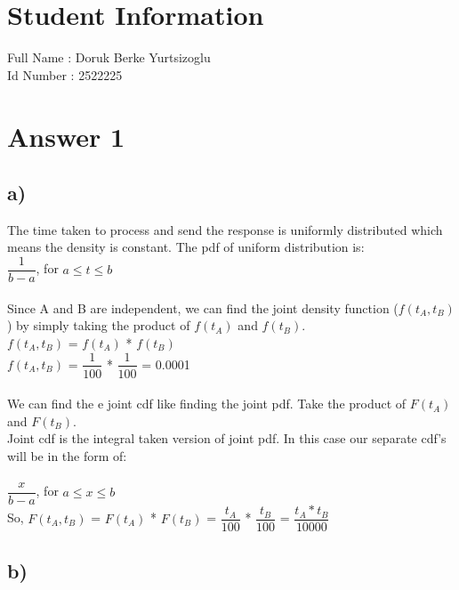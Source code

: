 \documentclass[12pt]{article}
\begin{document}
\section*{Student Information } 
Full Name : Doruk Berke Yurtsizoglu \\
Id Number :  2522225\\

\section*{Answer 1}

\subsection*{a)} 
The time taken to process and send the response is uniformly distributed which means the density is constant. The pdf of uniform distribution is:\\
$\dfrac{1}{b-a}$, for $a \leq t \leq b$\\
\\
Since A and B are independent, we can find the joint density function ($f(t_A , t_B )$) by simply taking the product of $f(t_A)$ and $f(t_B)$.\\
$f(t_A , t_B )$ = $f(t_A)$ *  $f(t_B)$ \\
$f(t_A , t_B )$ = $\dfrac{1}{100}$ * $\dfrac{1}{100}$ = 0.0001\\
\\
We can find the e joint cdf like finding the joint pdf. Take the product of $F(t_A)$ and $F(t_B)$.\\
Joint cdf is the integral taken version of joint pdf. In this case our separate cdf's will be in the form of:\\
\\
$\dfrac{x}{b-a}$, for $a \leq x \leq b$\\
 So, $F(t_A , t_B )$ = $F(t_A)$ *  $F(t_B)$ = $\dfrac{t_A}{100}$ * $\dfrac{t_B}{100}$ = $\dfrac{t_A * t_B}{10000}$\\


\subsection*{b)} 
\end{document}
